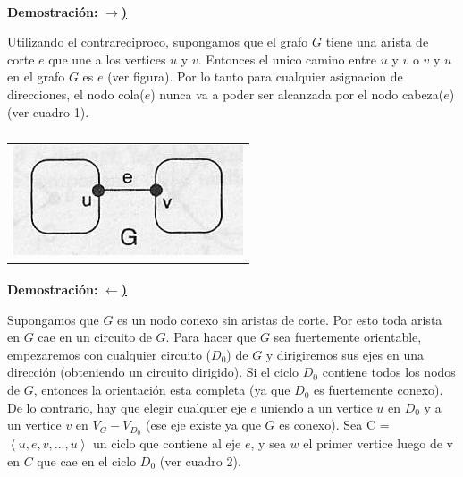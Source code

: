 \paragraph{} 
\textbf{Demostración:} \underline{\textbf{$\rightarrow$)}}

Utilizando el contrareciproco, supongamos que el grafo $G$ tiene una arista de corte $e$ que une a los vertices $u$ y $v$. Entonces el unico camino entre $u$ y $v$  o $v$ y $u$ en el grafo $G$ es $e$ (ver figura). Por lo tanto para cualquier asignacion de direcciones, el nodo cola($e$) nunca va a poder ser alcanzada por el nodo cabeza($e$) (ver cuadro 1).

	\begin{table}[h!] %
		\centering %
			\begin{tabular}{c}
				\includegraphics[scale=0.7]{./figura1.jpg} 

				\end{tabular}
				\caption{} %
				\label{} %
	\end{table}

\paragraph{} 
\textbf{Demostración:} \underline{\textbf{$\leftarrow$)}}

Supongamos que $G$ es un nodo conexo sin aristas de corte. Por esto toda arista en $G$ cae en un circuito de $G$.
Para hacer que $G$ sea fuertemente orientable, empezaremos con cualquier circuito ($D_0$) de $G$ y dirigiremos sus ejes en una dirección (obteniendo un circuito dirigido). Si el ciclo $D_0$ contiene todos los nodos de $G$, entonces la orientación esta completa (ya que $D_0$ es fuertemente conexo). De lo contrario, hay que elegir cualquier eje $e$ uniendo a un vertice $u$ en $D_0$ y a un vertice $v$ en $V_G - V_{D_0}$ (ese eje existe ya que $G$ es conexo). Sea C = $\left\langle u,e,v,...,u  \right\rangle$ un ciclo que contiene al eje $e$, y sea $w$ el primer vertice luego de v en $C$ que cae en el ciclo $D_0$ (ver cuadro 2).

